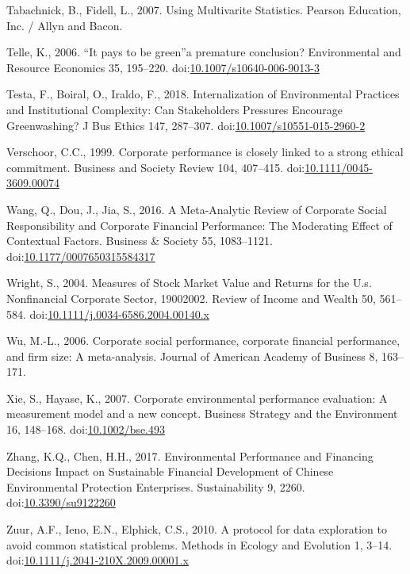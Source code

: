 \documentclass[12pt,]{article}
\begin{document}
\hypertarget{ref-Tabachnick2007}{}
Tabachnick, B., Fidell, L., 2007. Using Multivarite Statistics. Pearson
Education, Inc. / Allyn and Bacon.

\hypertarget{ref-Telle2006}{}
Telle, K., 2006. ``It pays to be green''a premature conclusion?
Environmental and Resource Economics 35, 195--220.
doi:\href{https://doi.org/10.1007/s10640-006-9013-3}{10.1007/s10640-006-9013-3}

\hypertarget{ref-Testa2018}{}
Testa, F., Boiral, O., Iraldo, F., 2018. Internalization of
Environmental Practices and Institutional Complexity: Can Stakeholders
Pressures Encourage Greenwashing? J Bus Ethics 147, 287--307.
doi:\href{https://doi.org/10.1007/s10551-015-2960-2}{10.1007/s10551-015-2960-2}

\hypertarget{ref-Verschoor1999}{}
Verschoor, C.C., 1999. Corporate performance is closely linked to a
strong ethical commitment. Business and Society Review 104, 407--415.
doi:\href{https://doi.org/10.1111/0045-3609.00074}{10.1111/0045-3609.00074}

\hypertarget{ref-WangMetaAnalyticReviewCorporate2016}{}
Wang, Q., Dou, J., Jia, S., 2016. A Meta-Analytic Review of Corporate
Social Responsibility and Corporate Financial Performance: The
Moderating Effect of Contextual Factors. Business \& Society 55,
1083--1121.
doi:\href{https://doi.org/10.1177/0007650315584317}{10.1177/0007650315584317}

\hypertarget{ref-Wright2004}{}
Wright, S., 2004. Measures of Stock Market Value and Returns for the
U.s. Nonfinancial Corporate Sector, 19002002. Review of Income and
Wealth 50, 561--584.
doi:\href{https://doi.org/10.1111/j.0034-6586.2004.00140.x}{10.1111/j.0034-6586.2004.00140.x}

\hypertarget{ref-Wu2006}{}
Wu, M.-L., 2006. Corporate social performance, corporate financial
performance, and firm size: A meta-analysis. Journal of American Academy
of Business 8, 163--171.

\hypertarget{ref-Xie2007}{}
Xie, S., Hayase, K., 2007. Corporate environmental performance
evaluation: A measurement model and a new concept. Business Strategy and
the Environment 16, 148--168.
doi:\href{https://doi.org/10.1002/bse.493}{10.1002/bse.493}

\hypertarget{ref-Zhang2017}{}
Zhang, K.Q., Chen, H.H., 2017. Environmental Performance and Financing
Decisions Impact on Sustainable Financial Development of Chinese
Environmental Protection Enterprises. Sustainability 9, 2260.
doi:\href{https://doi.org/10.3390/su9122260}{10.3390/su9122260}

\hypertarget{ref-Zuurprotocoldataexploration2010}{}
Zuur, A.F., Ieno, E.N., Elphick, C.S., 2010. A protocol for data
exploration to avoid common statistical problems. Methods in Ecology and
Evolution 1, 3--14.
doi:\href{https://doi.org/10.1111/j.2041-210X.2009.00001.x}{10.1111/j.2041-210X.2009.00001.x}
\end{document}
